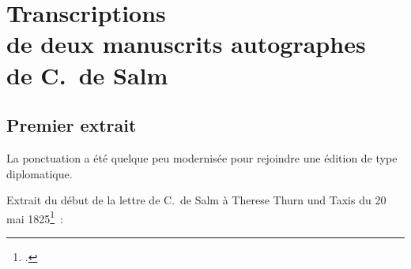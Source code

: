 \documentclass[a4paper,12pt,twoside]{book}
\begin{document}
	\addappheadtotoc%
	
	\appendixpage %
	
	\chapter{Transcriptions \\de deux manuscrits autographes \\de C.~de Salm}
		\label{autographes}
		
		\section{Premier extrait}
	
			La ponctuation a été quelque peu modernisée pour rejoindre une édition de type diplomatique.
		
			Extrait du début de la lettre de C.~de Salm à Therese Thurn und Taxis du 20 mai 1825\footcite{CdS67022030}~:
			
\end{document}
